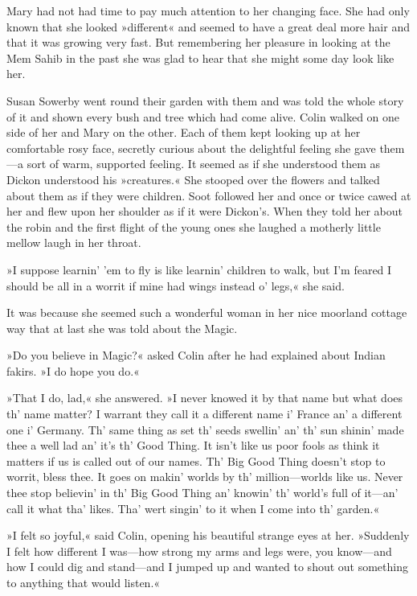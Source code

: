 Mary had not had time to pay much attention to her changing face. She had only known that she looked »different« and seemed to have a great deal more hair and that it was growing very fast. But remembering her pleasure in looking at the Mem Sahib in the past she was glad to hear that she might some day look like her.

Susan Sowerby went round their garden with them and was told the whole story of it and shown every bush and tree which had come alive. Colin walked on one side of her and Mary on the other. Each of them kept looking up at her comfortable rosy face, secretly curious about the delightful feeling she gave them—a sort of warm, supported feeling. It seemed as if she understood them as Dickon understood his »creatures.« She stooped over the flowers and talked about them as if they were children. Soot followed her and once or twice cawed at her and flew upon her shoulder as if it were Dickon's. When they told her about the robin and the first flight of the young ones she laughed a motherly little mellow laugh in her throat.

»I suppose learnin' 'em to fly is like learnin' children to walk, but I'm feared I should be all in a worrit if mine had wings instead o' legs,« she said.

It was because she seemed such a wonderful woman in her nice moorland cottage way that at last she was told about the Magic.

»Do you believe in Magic?« asked Colin after he had explained about Indian fakirs. »I do hope you do.«

»That I do, lad,« she answered. »I never knowed it by that name but what does th' name matter? I warrant they call it a different name i' France an' a different one i' Germany. Th' same thing as set th' seeds swellin' an' th' sun shinin' made thee a well lad an' it's th' Good Thing. It isn't like us poor fools as think it matters if us is called out of our names. Th' Big Good Thing doesn't stop to worrit, bless thee. It goes on makin' worlds by th' million—worlds like us. Never thee stop believin' in th' Big Good Thing an' knowin' th' world's full of it—an' call it what tha' likes. Tha' wert singin' to it when I come into th' garden.«

»I felt so joyful,« said Colin, opening his beautiful strange eyes at her. »Suddenly I felt how different I was—how strong my arms and legs were, you know—and how I could dig and stand—and I jumped up and wanted to shout out something to anything that would listen.«

